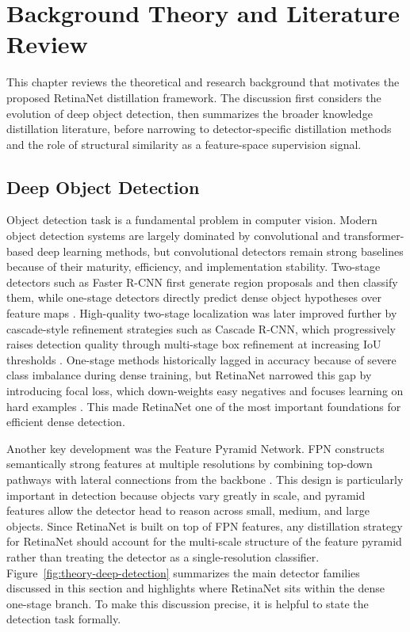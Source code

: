 \chapter{Background Theory and Literature Review}

This chapter reviews the theoretical and research background that motivates the proposed RetinaNet distillation framework. The discussion first considers the evolution of deep object detection, then summarizes the broader knowledge distillation literature, before narrowing to detector-specific distillation methods and the role of structural similarity as a feature-space supervision signal.

\section{Deep Object Detection}

Object detection task is a fundamental problem in computer vision. Modern object detection systems are largely dominated by convolutional and transformer-based deep learning methods, but convolutional detectors remain strong baselines because of their maturity, efficiency, and implementation stability. Two-stage detectors such as Faster R-CNN first generate region proposals and then classify them, while one-stage detectors directly predict dense object hypotheses over feature maps \cite{ren2015faster}. High-quality two-stage localization was later improved further by cascade-style refinement strategies such as Cascade R-CNN, which progressively raises detection quality through multi-stage box refinement at increasing IoU thresholds \cite{cai2021cascade}. One-stage methods historically lagged in accuracy because of severe class imbalance during dense training, but RetinaNet narrowed this gap by introducing focal loss, which down-weights easy negatives and focuses learning on hard examples \cite{lin2017focal}. This made RetinaNet one of the most important foundations for efficient dense detection.

Another key development was the Feature Pyramid Network. FPN constructs semantically strong features at multiple resolutions by combining top-down pathways with lateral connections from the backbone \cite{lin2017fpn}. This design is particularly important in detection because objects vary greatly in scale, and pyramid features allow the detector head to reason across small, medium, and large objects. Since RetinaNet is built on top of FPN features, any distillation strategy for RetinaNet should account for the multi-scale structure of the feature pyramid rather than treating the detector as a single-resolution classifier. Figure~\ref{fig:theory-deep-detection} summarizes the main detector families discussed in this section and highlights where RetinaNet sits within the dense one-stage branch. To make this discussion precise, it is helpful to state the detection task formally.

